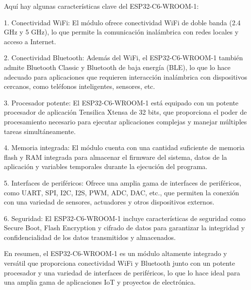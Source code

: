 Aquí hay algunas características clave del ESP32-C6-WROOM-1:

1. Conectividad WiFi: El módulo ofrece conectividad WiFi de doble banda (2.4 GHz y 5 GHz), lo que permite la comunicación inalámbrica con redes locales y acceso a Internet.

2. Conectividad Bluetooth: Además del WiFi, el ESP32-C6-WROOM-1 también admite Bluetooth Classic y Bluetooth de baja energía (BLE), lo que lo hace adecuado para aplicaciones que requieren interacción inalámbrica con dispositivos cercanos, como teléfonos inteligentes, sensores, etc.

3. Procesador potente: El ESP32-C6-WROOM-1 está equipado con un potente procesador de aplicación Tensilica Xtensa de 32 bits, que proporciona el poder de procesamiento necesario para ejecutar aplicaciones complejas y manejar múltiples tareas simultáneamente.

4. Memoria integrada: El módulo cuenta con una cantidad suficiente de memoria flash y RAM integrada para almacenar el firmware del sistema, datos de la aplicación y variables temporales durante la ejecución del programa.

5. Interfaces de periféricos: Ofrece una amplia gama de interfaces de periféricos, como UART, SPI, I2C, I2S, PWM, ADC, DAC, etc., que permiten la conexión con una variedad de sensores, actuadores y otros dispositivos externos.

6. Seguridad: El ESP32-C6-WROOM-1 incluye características de seguridad como Secure Boot, Flash Encryption y cifrado de datos para garantizar la integridad y confidencialidad de los datos transmitidos y almacenados.

En resumen, el ESP32-C6-WROOM-1 es un módulo altamente integrado y versátil que proporciona conectividad WiFi y Bluetooth junto con un potente procesador y una variedad de interfaces de periféricos, lo que lo hace ideal para una amplia gama de aplicaciones IoT y proyectos de electrónica.

